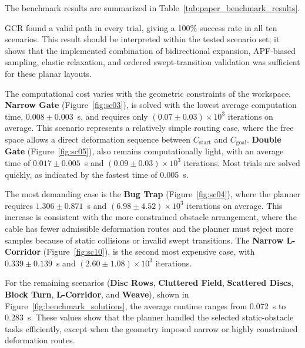 \documentclass{pas}
\begin{document}
The benchmark results are summarized in
Table~\ref{tab:paper_benchmark_results}.

\begin{table}[t]
    \centering
    \caption{Benchmark performance for the selected GCR scenarios.}
    \label{tab:paper_benchmark_results}
    \setlength{\tabcolsep}{2.5pt}
    
\end{table}

GCR found a valid path in every trial, giving a 100\% success rate in all ten scenarios.
This result should be interpreted within the tested scenario set; it shows that the implemented combination of bidirectional expansion, APF-biased sampling, elastic relaxation, and ordered swept-transition validation was sufficient for these planar layouts.

The computational cost varies with the geometric constraints of the workspace.
\textbf{Narrow Gate} (Figure~\ref{fig:sc03}), is solved with the lowest average computation time, $0.008 \pm 0.003$~s, and requires only $(0.07 \pm 0.03)\times 10^3$ iterations on average.
This scenario represents a relatively simple routing case, where the free space allows a direct deformation sequence between $C_{\mathrm{start}}$ and $C_{\mathrm{goal}}$.
\textbf{Double Gate} (Figure~\ref{fig:sc05}), also remains computationally light, with an average time of $0.017 \pm 0.005$~s and $(0.09 \pm 0.03)\times 10^3$ iterations.
Most trials are solved quickly, as indicated by the fastest time of 0.005~s.

The most demanding case is the \textbf{Bug Trap} (Figure~\ref{fig:sc04}), where the planner requires $1.306 \pm 0.871$~s and $(6.98 \pm 4.52)\times 10^3$ iterations on average.
This increase is consistent with the more constrained obstacle arrangement, where the cable has fewer admissible deformation routes and the planner must reject more samples because of static collisions or invalid swept transitions.
The \textbf{Narrow L-Corridor} (Figure~\ref{fig:sc10}), is the second most expensive case, with $0.339 \pm 0.139$~s and $(2.60 \pm 1.08)\times 10^3$ iterations.

For the remaining scenarios (\textbf{Disc Rows}, \textbf{Cluttered Field}, \textbf{Scattered Discs}, \textbf{Block Turn}, \textbf{L-Corridor}, and \textbf{Weave}), shown in Figure~\ref{fig:benchmark_solutions}, the average runtime ranges from 0.072~s to 0.283~s.
These values show that the planner handled the selected static-obstacle tasks efficiently, except when the geometry imposed narrow or highly constrained deformation routes.
\end{document}
